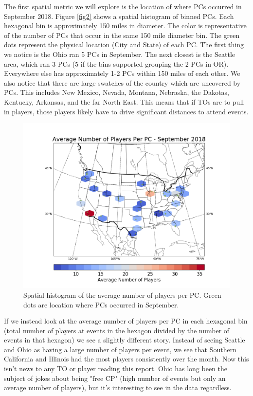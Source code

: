 \documentclass[11pt,twocolumn]{article}
\begin{document}
The first spatial metric we will explore is the location of where PCs occurred in September 2018. Figure \ref{fig2} shows a spatial histogram of binned PCs. Each hexagonal bin is approximately 150 miles in diameter. The color is representative of the number of PCs that occur in the same 150 mile diameter bin. The green dots represent the physical location (City and State) of each PC. The first thing we notice is the Ohio ran 5 PCs in September. The next closest is the Seattle area, which ran 3 PCs (5 if the bins supported grouping the 2 PCs in OR). Everywhere else has approximately 1-2 PCs within 150 miles of each other. We also notice that there are large swatches of the country which are uncovered by PCs. This includes New Mexico, Nevada, Montana, Nebraska, the Dakotas, Kentucky, Arkansas, and the far North East. This means that if TOs are to pull in players, those players likely have to drive significant distances to attend events. 

\begin{figure}[ht]
	\includegraphics[width=\columnwidth]{../figs/Figure_3.png}
	\caption{Spatial histogram of the average number of players per PC. Green dots are location where PCs occurred in September.}
	\label{fig3}
\end{figure}

If we instead look at the average number of players per PC in each hexagonal bin (total number of players at events in the hexagon divided by the number of events in that hexagon) we see a slightly different story. Instead of seeing Seattle and Ohio as having a large number of players per event, we see that Southern California and Illinois had the most players consistently over the month. Now this isn't news to any TO or player reading this report. Ohio has long been the subject of jokes about being "free CP" (high number of events but only an average number of players), but it's interesting to see in the data regardless. 
\end{document}
